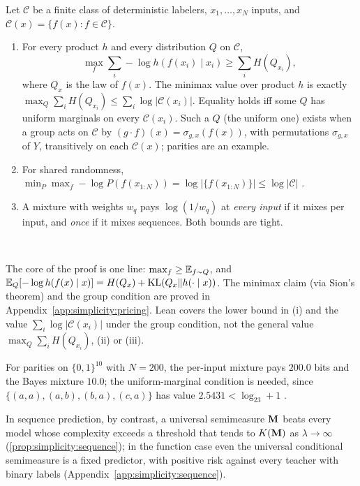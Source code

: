 \begin{theorem}\label{thm:simplicity:pricing}
Let $\mathcal C$ be a finite class of deterministic labelers, $x_1,\dots,x_N$ inputs, and $\mathcal C(x)=\{f(x):f\in\mathcal C\}$.
\begin{enumerate}[label=(\roman*)]
\item For every product $h$ and every distribution $Q$ on $\mathcal C$,
\[
\max_f\sum_i-\log h(f(x_i)\mid x_i)\ge\sum_iH(Q_{x_i}),
\]
where $Q_x$ is the law of $f(x)$. The minimax value over product $h$ is exactly $\max_Q\sum_iH(Q_{x_i})\le\sum_i\log|\mathcal C(x_i)|$. Equality holds iff some $Q$ has uniform marginals on every $\mathcal C(x_i)$. Such a $Q$ (the uniform one) exists when a group acts on $\mathcal C$ by $(g\cdot f)(x)=\sigma_{g,x}(f(x))$, with permutations $\sigma_{g,x}$ of $Y$, transitively on each $\mathcal C(x)$; parities are an example.
\item For shared randomness, $\min_P\max_f-\log P(f(x_{1:N}))=\log|\{f(x_{1:N})\}|\le\log|\mathcal C|$ \citep{shtarkov1987universal}.
\item A mixture with weights $w_q$ pays $\log(1/w_q)$ at \emph{every input} if it mixes per input, and \emph{once} if it mixes sequences. Both bounds are tight.
\end{enumerate}

\hfill{}\ 
\end{theorem}

The core of the proof is one line: $\max_f\ge\mathbb{E}_{f\sim Q}$, and $\mathbb{E}_Q[-\log h(f(x)\mid x)]=H(Q_x)+\mathrm{KL}(Q_x\|h(\cdot\mid x))$. The minimax claim (via Sion's theorem) and the group condition are proved in Appendix~\ref{app:simplicity:pricing}. Lean covers the lower bound in (i) and the value $\sum_i\log|\mathcal C(x_i)|$ under the group condition, not the general value $\max_Q\sum_iH(Q_{x_i})$, (ii) or (iii).

For parities on $\{0,1\}^{10}$ with $N=200$, the per-input mixture pays $200.0$ bits and the Bayes mixture $10.0$; the uniform-marginal condition is needed, since $\{(a,a),(a,b),(b,a),(c,a)\}$ has value $2.5431<\log_23+1$ .

In sequence prediction, by contrast, a universal semimeasure $\mathbf M$ beats every model whose complexity exceeds a threshold that tends to $K(\mathbf M)$ as $\lambda\to\infty$ (\cref{prop:simplicity:sequence}); in the function case even the universal conditional semimeasure is a fixed predictor, with positive risk against every teacher with binary labels (Appendix~\ref{app:simplicity:sequence}).


